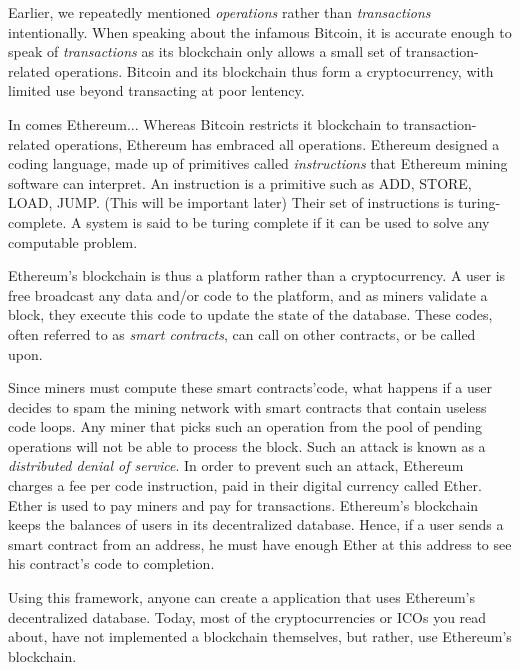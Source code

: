 Earlier, we repeatedly mentioned \emph{operations} rather than \emph{transactions} intentionally.
When speaking about the infamous Bitcoin, it is accurate enough to speak of \emph{transactions} as its blockchain
only allows a small set of transaction-related operations.
Bitcoin and its blockchain thus form a cryptocurrency, with limited use beyond transacting at poor lentency.

In comes Ethereum...
Whereas Bitcoin restricts it blockchain to transaction-related operations, Ethereum has embraced all operations.
Ethereum designed a coding language, made up of primitives called \emph{instructions} that Ethereum mining software can interpret.
An instruction is a primitive such as ADD, STORE, LOAD, JUMP. (This will be important later)
Their set of instructions is turing-complete.
A system is said to be turing complete if it can be used to solve any computable problem.

Ethereum's blockchain is thus a platform rather than a cryptocurrency.
A user is free broadcast any data and/or code to the platform, and as miners validate a block,
they execute this code to update the state of the database.
These codes, often referred to as \emph{smart contracts}, can call on other contracts, or be called upon.

Since miners must compute these smart contracts'code, what happens if a user decides to spam the mining network with
smart contracts that contain useless code loops. 
Any miner that picks such an operation from the pool of pending operations will not be able to process the block.
Such an attack is known as a \emph{distributed denial of service}.
In order to prevent such an attack, Ethereum charges a fee per code instruction, paid in their digital currency called Ether.
Ether is used to pay miners and pay for transactions.
Ethereum's blockchain keeps the balances of users in its decentralized database.
Hence, if a user sends a smart contract from an address, he must have enough Ether at this address to see his contract's code
to completion.



Using this framework, anyone can create a application that uses Ethereum's decentralized database.
Today, most of the cryptocurrencies or ICOs you read about, have not implemented a blockchain themselves,
but rather, use Ethereum's blockchain.

